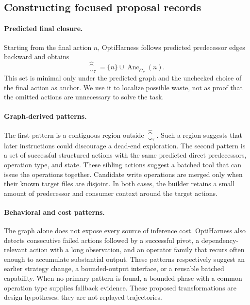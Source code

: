 \subsection{Constructing focused proposal records}

\paragraph{Predicted final closure.}
Starting from the final action $n$, OptiHarness follows predicted predecessor edges backward and obtains
\begin{equation}
    \widehat\closure_\tau=\{n\}\cup\operatorname{Anc}_{\widehat G_\tau}(n).
\end{equation}
This set is minimal only under the predicted graph and the unchecked choice of the final action as anchor. We use it to localize possible waste, not as proof that the omitted actions are unnecessary to solve the task.

\paragraph{Graph-derived patterns.}
The first pattern is a contiguous region outside $\widehat\closure_\tau$. Such a region suggests that later instructions could discourage a dead-end exploration. The second pattern is a set of successful structured actions with the same predicted direct predecessors, operation type, and state. These sibling actions suggest a batched tool that can issue the operations together. Candidate write operations are merged only when their known target files are disjoint. In both cases, the builder retains a small amount of predecessor and consumer context around the target actions.

\paragraph{Behavioral and cost patterns.}
The graph alone does not expose every source of inference cost. OptiHarness also detects consecutive failed actions followed by a successful pivot, a dependency-relevant action with a long observation, and an operator family that recurs often enough to accumulate substantial output. These patterns respectively suggest an earlier strategy change, a bounded-output interface, or a reusable batched capability. When no primary pattern is found, a bounded phase with a common operation type supplies fallback evidence. These proposed transformations are design hypotheses; they are not replayed trajectories.

